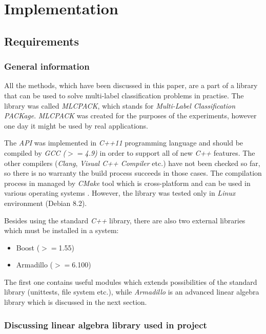 \chapter{Implementation}

\section{Requirements}

\subsection{General information}
All the methods, which have been discussed in this paper, are a part of a library that can be used to solve multi-label classification problems in practise. The library was called \textit{MLCPACK}, which stands for \textit{Multi-Label Classification PACKage}. \textit{MLCPACK} was created for the purposes of the experiments, however one day it might be used by real applications. 

The \textit{API} was implemented in \textit{C++11} programming language and should be compiled by \textit{GCC ($>=$4.9)} in order to support all of new \textit{C++} features. The other compilers (\textit{Clang}, \textit{Visual C++ Compiler} etc.) have not been checked so far, so there is no warranty the build process succeeds in those cases.  The compilation process in managed by \textit{CMake} tool which is cross-platform and can be used in various operating systems \cite{CMake}. However, the library was tested only in \textit{Linux} environment (Debian 8.2). 

Besides using the standard \textit{C++} library, there are also two external libraries which must be installed in a system: 

\begin{itemize}
    \item Boost ($>=$1.55)
    \item Armadillo ($>=$6.100)
\end{itemize}
The first one contains useful modules which extends possibilities of the standard library (unittests, file system etc.), while \textit{Armadillo} is an advanced linear algebra library which is discussed in the next section.  


\subsection{Discussing linear algebra library used in project}

